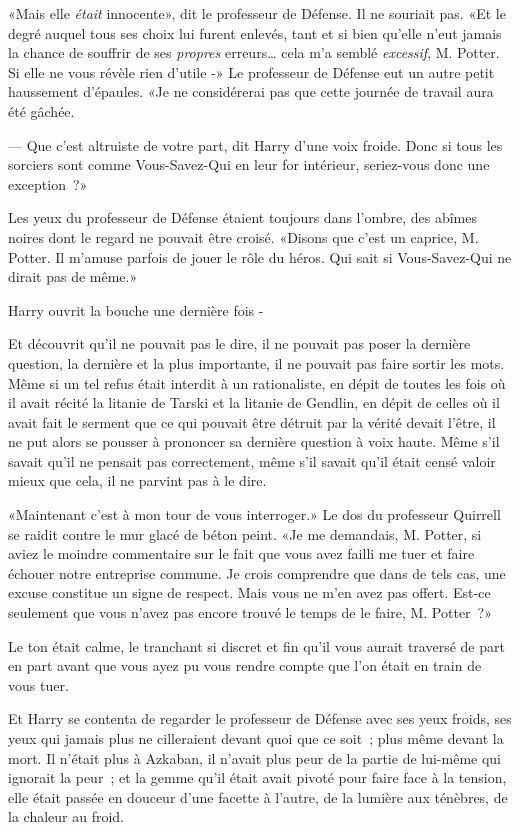 «Mais elle \emph{était} innocente», dit le professeur de Défense. Il ne souriait pas. «Et le degré auquel tous ses choix lui furent enlevés, tant et si bien qu'elle n'eut jamais la chance de souffrir de ses \emph{propres} erreurs… cela m'a semblé \emph{excessif}, M. Potter. Si elle ne vous révèle rien d'utile -» Le professeur de Défense eut un autre petit haussement d'épaules. «Je ne considérerai pas que cette journée de travail aura été gâchée.

--- Que c'est altruiste de votre part, dit Harry d'une voix froide. Donc si tous les sorciers sont comme Vous-Savez-Qui en leur for intérieur, seriez-vous donc une exception~?»

Les yeux du professeur de Défense étaient toujours dans l'ombre, des abîmes noires dont le regard ne pouvait être croisé. «Disons que c'est un caprice, M. Potter. Il m'amuse parfois de jouer le rôle du héros. Qui sait si Vous-Savez-Qui ne dirait pas de même.»

Harry ouvrit la bouche une dernière fois -

Et découvrit qu'il ne pouvait pas le dire, il ne pouvait pas poser la dernière question, la dernière et la plus importante, il ne pouvait pas faire sortir les mots. Même si un tel refus était interdit à un rationaliste, en dépit de toutes les fois où il avait récité la litanie de Tarski et la litanie de Gendlin, en dépit de celles où il avait fait le serment que ce qui pouvait être détruit par la vérité devait l'être, il ne put alors se pousser à prononcer sa dernière question à voix haute. Même s'il savait qu'il ne pensait pas correctement, même s'il savait qu'il était censé valoir mieux que cela, il ne parvint pas à le dire.

«Maintenant c'est à mon tour de vous interroger.» Le dos du professeur Quirrell se raidit contre le mur glacé de béton peint. «Je me demandais, M. Potter, si aviez le moindre commentaire sur le fait que vous avez failli me tuer et faire échouer notre entreprise commune. Je crois comprendre que dans de tels cas, une excuse constitue un signe de respect. Mais vous ne m'en avez pas offert. Est-ce seulement que vous n'avez pas encore trouvé le temps de le faire, M. Potter~?»

Le ton était calme, le tranchant si discret et fin qu'il vous aurait traversé de part en part avant que vous ayez pu vous rendre compte que l'on était en train de vous tuer.

Et Harry se contenta de regarder le professeur de Défense avec ses yeux froids, ses yeux qui jamais plus ne cilleraient devant quoi que ce soit~; plus même devant la mort. Il n'était plus à Azkaban, il n'avait plus peur de la partie de lui-même qui ignorait la peur~; et la gemme qu'il était avait pivoté pour faire face à la tension, elle était passée en douceur d'une facette à l'autre, de la lumière aux ténèbres, de la chaleur au froid.


